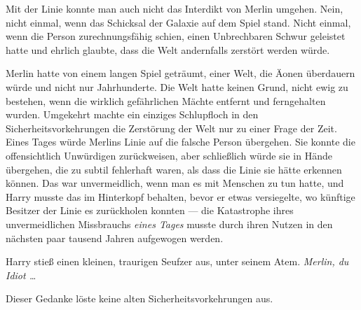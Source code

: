 Mit der Linie konnte man auch nicht das Interdikt von Merlin umgehen. Nein, nicht einmal, wenn das Schicksal der Galaxie auf dem Spiel stand. Nicht einmal, wenn die Person zurechnungsfähig schien, einen Unbrechbaren Schwur geleistet hatte und ehrlich glaubte, dass die Welt andernfalls zerstört werden würde.

Merlin hatte von einem langen Spiel geträumt, einer Welt, die Äonen überdauern würde und nicht nur Jahrhunderte. Die Welt hatte keinen Grund, nicht ewig zu bestehen, wenn die wirklich gefährlichen Mächte entfernt und ferngehalten wurden. Umgekehrt machte ein einziges Schlupfloch in den Sicherheitsvorkehrungen die Zerstörung der Welt nur zu einer Frage der Zeit. Eines Tages würde Merlins Linie auf die falsche Person übergehen. Sie konnte die offensichtlich Unwürdigen zurückweisen, aber schließlich würde sie in Hände übergehen, die zu subtil fehlerhaft waren, als dass die Linie sie hätte erkennen können. Das war unvermeidlich, wenn man es mit Menschen zu tun hatte, und Harry musste das im Hinterkopf behalten, bevor er etwas versiegelte, wo künftige Besitzer der Linie es zurückholen konnten — die Katastrophe ihres unvermeidlichen Missbrauchs \emph{eines Tages} musste durch ihren Nutzen in den nächsten paar tausend Jahren aufgewogen werden.

Harry stieß einen kleinen, traurigen Seufzer aus, unter seinem Atem.
\emph{Merlin, du Idiot …}

Dieser Gedanke löste keine alten Sicherheitsvorkehrungen aus.

